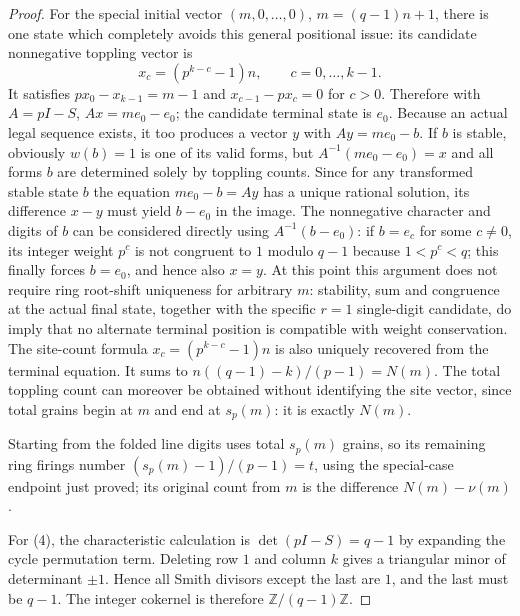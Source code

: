 \documentclass[10pt]{article}
\theoremstyle{definition}\newtheorem*{definition}{Definition}
\theoremstyle{remark}\newtheorem*{remark}{Remark}
\begin{document}
\begin{proof}
For the special initial vector $(m,0,\ldots,0)$, $m=(q-1)n+1$, there is one
state which completely avoids this general positional issue: its candidate
nonnegative toppling vector is
\[
 x_c=(p^{k-c}-1)n,\qquad c=0,\ldots,k-1.
\]
It satisfies $p x_0-x_{k-1}=m-1$ and $x_{c-1}-p x_c=0$ for $c>0$. Therefore
with $A=pI-S$, $Ax=me_0-e_0$; the candidate terminal state is $e_0$.
Because an actual legal sequence exists, it too produces a vector $y$ with
$Ay=me_0-b$. If $b$ is stable, obviously $w(b)=1$ is one of its valid forms,
but $A^{-1}(me_0-e_0)=x$ and all forms $b$ are determined solely by toppling
counts. Since for any transformed stable state $b$ the equation
$me_0-b=Ay$ has a unique rational solution, its difference $x-y$ must yield
$b-e_0$ in the image. The nonnegative character and digits of $b$ can be
considered directly using $A^{-1}(b-e_0)$: if $b=e_c$ for some $c\ne0$, its
integer weight $p^c$ is not congruent to $1$ modulo $q-1$ because
$1<p^c<q$; this finally forces $b=e_0$, and hence also $x=y$. At this point
this argument does not require ring root-shift uniqueness for arbitrary $m$:
stability, sum and congruence at the actual final state, together with the
specific $r=1$ single-digit candidate, do imply that no alternate terminal
position is compatible with weight conservation. The site-count formula
$x_c=(p^{k-c}-1)n$ is also uniquely recovered from the terminal equation.
It sums to $n((q-1)-k)/(p-1)=N(m)$. The total toppling count can moreover be
obtained without identifying the site vector, since total grains begin at $m$
and end at $s_p(m)$: it is exactly $N(m)$.

Starting from the folded line digits uses total $s_p(m)$ grains, so its
remaining ring firings number $(s_p(m)-1)/(p-1)=t$, using the special-case
endpoint just proved; its original count from $m$ is the difference
$N(m)-\nu(m)$.

For (4), the characteristic calculation is
$\det(pI-S)=q-1$ by expanding the cycle permutation term. Deleting row $1$
and column $k$ gives a triangular minor of determinant $\pm1$. Hence all
Smith divisors except the last are $1$, and the last must be $q-1$. The integer
cokernel is therefore $\mathbb Z/(q-1)\mathbb Z$.\end{proof}
\end{document}
